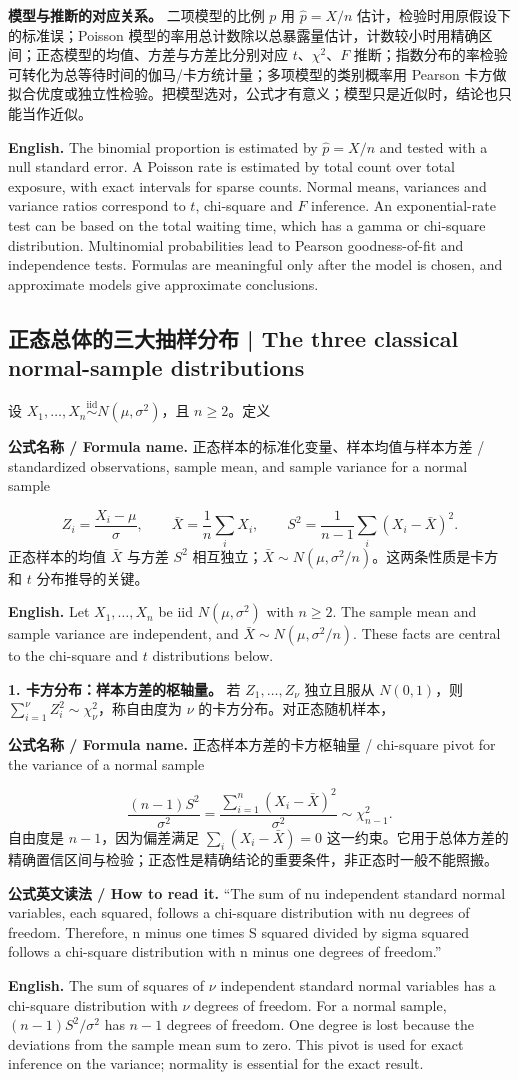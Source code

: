 \documentclass[UTF8,11pt,a4paper]{ctexart}
\newcommand{\EN}[1]{\par\noindent\textbf{English.} #1\par}
\newcommand{\READ}[1]{\par\noindent\textbf{公式英文读法 / How to read it.} #1\par}
\newcommand{\FORMULA}[2]{\par\noindent\textbf{公式名称 / Formula name.} #1 / #2\par}
\begin{document}
\noindent\textbf{模型与推断的对应关系。} 二项模型的比例 $p$ 用 $\hat p=X/n$ 估计，检验时用原假设下的标准误；Poisson 模型的率用总计数除以总暴露量估计，计数较小时用精确区间；正态模型的均值、方差与方差比分别对应 $t$、$\chi^2$、$F$ 推断；指数分布的率检验可转化为总等待时间的伽马/卡方统计量；多项模型的类别概率用 Pearson 卡方做拟合优度或独立性检验。把模型选对，公式才有意义；模型只是近似时，结论也只能当作近似。
\EN{The binomial proportion is estimated by $\hat p=X/n$ and tested with a null standard error. A Poisson rate is estimated by total count over total exposure, with exact intervals for sparse counts. Normal means, variances and variance ratios correspond to $t$, chi-square and $F$ inference. An exponential-rate test can be based on the total waiting time, which has a gamma or chi-square distribution. Multinomial probabilities lead to Pearson goodness-of-fit and independence tests. Formulas are meaningful only after the model is chosen, and approximate models give approximate conclusions.}

\subsection{正态总体的三大抽样分布 | The three classical normal-sample distributions}
\noindent 设 $X_1,\ldots,X_n\overset{\mathrm{iid}}{\sim}N(\mu,\sigma^2)$，且 $n\ge2$。定义
\FORMULA{正态样本的标准化变量、样本均值与样本方差}{standardized observations, sample mean, and sample variance for a normal sample}
\[
Z_i=\frac{X_i-\mu}{\sigma},\qquad
\bar X=\frac1n\sum_iX_i,\qquad
S^2=\frac1{n-1}\sum_i(X_i-\bar X)^2.
\]
正态样本的均值 $\bar X$ 与方差 $S^2$ 相互独立；$\bar X\sim N(\mu,\sigma^2/n)$。这两条性质是卡方和 $t$ 分布推导的关键。
\EN{Let $X_1,\ldots,X_n$ be iid $N(\mu,\sigma^2)$ with $n\ge2$. The sample mean and sample variance are independent, and $\bar X\sim N(\mu,\sigma^2/n)$. These facts are central to the chi-square and $t$ distributions below.}

\noindent\textbf{1. 卡方分布：样本方差的枢轴量。} 若 $Z_1,\ldots,Z_\nu$ 独立且服从 $N(0,1)$，则 $\sum_{i=1}^{\nu}Z_i^2\sim\chi^2_\nu$，称自由度为 $\nu$ 的卡方分布。对正态随机样本，
\FORMULA{正态样本方差的卡方枢轴量}{chi-square pivot for the variance of a normal sample}
\[
\frac{(n-1)S^2}{\sigma^2}
=\frac{\sum_{i=1}^n(X_i-\bar X)^2}{\sigma^2}
\sim\chi^2_{n-1}.
\]
自由度是 $n-1$，因为偏差满足 $\sum_i(X_i-\bar X)=0$ 这一约束。它用于总体方差的精确置信区间与检验；正态性是精确结论的重要条件，非正态时一般不能照搬。
\READ{“The sum of nu independent standard normal variables, each squared, follows a chi-square distribution with nu degrees of freedom. Therefore, n minus one times S squared divided by sigma squared follows a chi-square distribution with n minus one degrees of freedom.”}
\EN{The sum of squares of $\nu$ independent standard normal variables has a chi-square distribution with $\nu$ degrees of freedom. For a normal sample, $(n-1)S^2/\sigma^2$ has $n-1$ degrees of freedom. One degree is lost because the deviations from the sample mean sum to zero. This pivot is used for exact inference on the variance; normality is essential for the exact result.}
\end{document}
